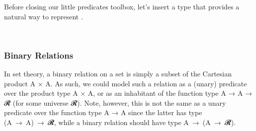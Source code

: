 \ccpad
Before closing our little predicates toolbox, let's insert a type that provides a natural way to represent .
\ccpad
\begin{code}
\>[0]\AgdaSpace{}%
\AgdaSymbol{:}\AgdaSpace{}%
\AgdaSymbol{\{}\AgdaSpace{}%
\AgdaSymbol{:}\AgdaSpace{}%
\AgdaSymbol{\}\{}\AgdaSpace{}%
\AgdaSymbol{:}\AgdaSpace{}%
\AgdaSpace{}%
\AgdaSymbol{\}}\AgdaSpace{}%
\AgdaSpace{}%
\AgdaSpace{}%
\AgdaSpace{}%
\AgdaSpace{}%
\AgdaSpace{}%
\AgdaSymbol{\AgdaUnderscore{}}\<%
\\
\>[0]\AgdaSpace{}%
\AgdaSpace{}%
\AgdaSpace{}%
\AgdaSymbol{=}\AgdaSpace{}%
\AgdaSpace{}%
\<%
\end{code}





\subsubsection{Binary Relations}\label{sec:binary-relations}

In set theory, a binary relation on a set  is simply a subset of the Cartesian product \ab A × \ab A. As such, we could model such a relation as a (unary) predicate over the product type \ab A \af × \ab A, or as an inhabitant of the function type \ab A \as → \ab A \as → \ab 𝓡\af ̇ (for some universe \ab 𝓡).  Note, however, this is not the same as a unary predicate over the function type \ab A \as → \ab A since the latter has type  (\ab A~\as →~\ab A)~\as →~\ab 𝓡\af ̇, while a binary relation should have type \ab A~\as →~(\ab A~\as →~\ab 𝓡\af ̇). 

